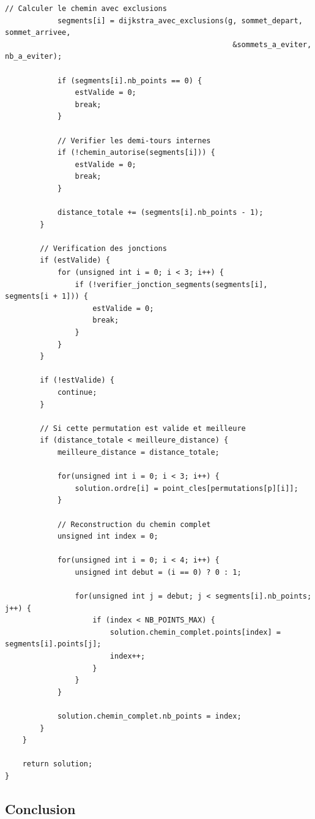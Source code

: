 \documentclass[11pt,a4paper]{article}
\begin{document}
\begin{lstlisting}[caption={Fonction de résolution du chemin optimal}, label=lst:resoudre]
            // Calculer le chemin avec exclusions
            segments[i] = dijkstra_avec_exclusions(g, sommet_depart, sommet_arrivee, 
                                                    &sommets_a_eviter, nb_a_eviter);

            if (segments[i].nb_points == 0) {
                estValide = 0;
                break;
            }

            // Verifier les demi-tours internes
            if (!chemin_autorise(segments[i])) {
                estValide = 0;
                break;
            }

            distance_totale += (segments[i].nb_points - 1);
        }

        // Verification des jonctions
        if (estValide) {
            for (unsigned int i = 0; i < 3; i++) {
                if (!verifier_jonction_segments(segments[i], segments[i + 1])) {
                    estValide = 0;
                    break;
                }
            }
        }

        if (!estValide) {
            continue;
        }

        // Si cette permutation est valide et meilleure
        if (distance_totale < meilleure_distance) {
            meilleure_distance = distance_totale;

            for(unsigned int i = 0; i < 3; i++) {
                solution.ordre[i] = point_cles[permutations[p][i]];
            }

            // Reconstruction du chemin complet
            unsigned int index = 0;
            
            for(unsigned int i = 0; i < 4; i++) {
                unsigned int debut = (i == 0) ? 0 : 1;
                
                for(unsigned int j = debut; j < segments[i].nb_points; j++) {
                    if (index < NB_POINTS_MAX) {
                        solution.chemin_complet.points[index] = segments[i].points[j];
                        index++;
                    }
                }
            }
            
            solution.chemin_complet.nb_points = index;
        } 
    }

    return solution;
}
\end{lstlisting}

\subsection{Conclusion}
\end{document}
